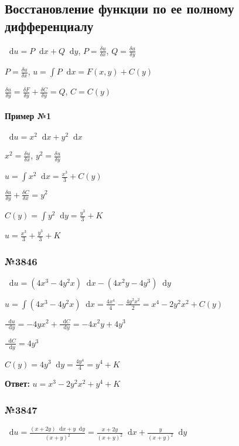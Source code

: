 \documentclass{article}
\newcommand*\diff{\mathop{}\!\mathrm{d}}
\begin{document}
\subsection{Восстановление функции по ее полному дифференциалу}

$\diff u = P \diff x + Q \diff y$, $P = \frac{\delta u}{\delta x}$, $Q = \frac{\delta u}{\delta y}$

$P = \frac{\delta u}{\delta x}$, $u = \int P \diff x = F(x, y) + C(y)$

$\frac{\delta u}{\delta y} = \frac{\delta F}{\delta y} + \frac{\delta C}{\delta y} = Q$, $C = C(y)$

\paragraph{Пример №1}

$\diff u = x^2 \diff x + y^2 \diff x$

$x^2 = \frac{\delta u}{\delta x}$, $y^2 = \frac{\delta u}{\delta y}$

$u = \int x^2 \diff x = \frac{x^3}{3} + C(y)$

$\frac{\delta u}{\delta y} + \frac{\delta C}{\delta x} = y^2$

$C(y) = \int y^2 \diff y = \frac{y^3}{3} + K$

$u = \frac{x^3}{3} + \frac{y^3}{3} + K$

\subsubsection{№3846}

$\diff u = (4x^3 - 4y^2 x) \diff x - (4x^2 y - 4y^3) \diff y$

$u = \int (4x^3 - 4y^2 x) \diff x = \frac{4x^4}{4} - \frac{4y^2 x^2}{2} = x^4 - 2y^2 x^2 + C(y)$

$\frac{\diff u}{\diff y} = -4yx^2 + \frac{\diff C}{\diff y} = -4x^2 y + 4y^3$

$\frac{\diff C}{\diff y} = 4y^3$

$C(y) = 4y^3 \diff y = \frac{4y^4}{4} = y^4 + K$

\textbf{Ответ:} $u = x^3 - 2y^2 x^2 + y^4 + K$

\subsubsection{№3847}

$\diff u = \frac{(x + 2y) \diff x + y \diff y}{(x + y)^2} = \frac{x + 2y}{(x+y)^2} \diff x + \frac{y}{(x + y)^2} \diff y$
\end{document}
